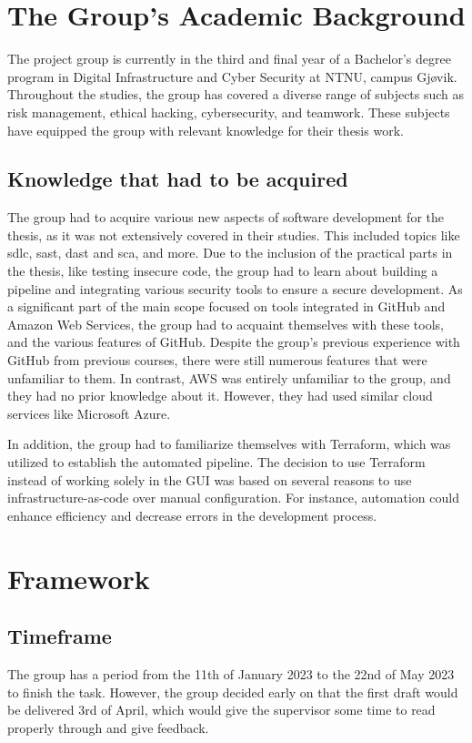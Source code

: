   

\section{The Group’s Academic Background}
The project group is currently in the third and final year of a Bachelor's degree program in Digital Infrastructure and Cyber Security at NTNU, campus Gjøvik. Throughout the studies, the group has covered a diverse range of subjects such as risk management, ethical hacking, cybersecurity, and teamwork. These subjects have equipped the group with relevant knowledge for their thesis work.

\subsection{Knowledge that had to be acquired}
\label{section: Knowledge that had to be acquired}
The group had to acquire various new aspects of software development for the thesis, as it was not extensively covered in their studies. This included topics like \acrshort{sdlc}, \acrlong{sast}, \acrlong{dast} and \acrlong{sca}, and more. Due to the inclusion of the practical parts in the thesis, like testing insecure code, the group had to learn about building a pipeline and integrating various security tools to ensure a secure development. As a significant part of the main scope focused on tools integrated in GitHub and Amazon Web Services, the group had to acquaint themselves with these tools, and the various features of GitHub. Despite the group's previous experience with GitHub from previous courses, there were still numerous features that were unfamiliar to them. In contrast, AWS was entirely unfamiliar to the group, and they had no prior knowledge about it. However, they had used similar cloud services like Microsoft Azure.

In addition, the group had to familiarize themselves with Terraform, which was utilized to establish the automated pipeline. The decision to use Terraform instead of working solely in the GUI was based on several reasons to use infrastructure-as-code over manual configuration. For instance, automation could enhance efficiency and decrease errors in the development process.

\section{Framework}

\subsection{Timeframe}
The group has a period from the 11th of January 2023 to the 22nd of May 2023 to finish the task. However, the group decided early on that the first draft would be delivered 3rd of April, which would give the supervisor some time to read properly through and give feedback. 

